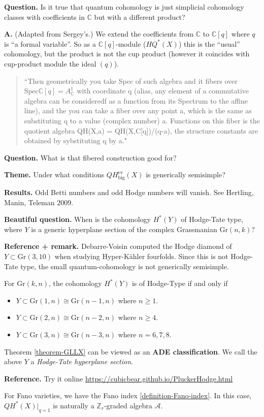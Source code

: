 {\bf Question.} Is it true that quantum cohomology is just simplicial cohomology
classes with coefficients in $\mathbb{C}$ but with a different product?

{\bf A.} (Adapted from Sergey's.) We extend the coefficients from $\mathbb{C}$
to $\mathbb{C}[q]$ where $q$ is ``a formal variable''. So as a
$\mathbb{C}[q]$-module ($HQ^*(X)$) this is the ``usual'' cohomology, but the
product is not the cup product (however it coincides with cup-product module the
ideal $(q)$).

\begin{quotation}
``Then geometrically you take Spec of such algebra and it
fibers over $\text{Spec} \mathbb{C}[q] = A^1_\mathbb{C}$ with coordinate q
(alias, any element of a commutative algebra can be consideredf as a function
from its Spectrum to the affine line), and the you can take a fiber over any
point a, which is the same as substituting q to a value (complex number) a.
Functions on this fiber is the quotient algebra QH(X,a) = QH(X,C[q])/(q-a), the
structure constants are obtained by sybstituting q by a."
\end{quotation}

{\bf Question.} What is that fibered construction good for?


{\bf Theme.} Under what conditions $QH^{\text{ev}}_{\text{big}}(X)$ is
generically semisimple?

{\bf Results.} Odd Betti numbers and odd Hodge numbers will vanish. See
Hertling, Manin, Teleman 2009.

{\bf Beautiful question.} When is the cohomology $H^*(Y)$ of Hodge-Tate type,
where $Y$ is a generic hyperplane section of the complex Grassmanian
$\text{Gr}(n,k)$?

{\bf Reference + remark.} Debarre-Voisin computed the Hodge diamond of $Y
\subset \text{Gr}(3,10)$ when studying Hyper-Kähler fourfolds. Since this is not
Hodge-Tate type, the small quantum-cohomology is not generically semisimple.

\begin{theorem}
\label{theorem-GLLX}
For $\text{Gr}(k,n)$, the cohomology $H^{*}(Y)$ is of Hodge-Type if and only if
\begin{itemize}
\item $Y \subset \text{Gr}(1,n)\cong \text{Gr}(n-1,n)$ where $n\geq 1$.
\item $Y \subset \text{Gr}(2,n) \cong \text{Gr}(n-2,n)$ where $n \geq 4$.
\item $Y \subset\text{Gr}(3,n) \cong\text{Gr}(n-3,n)$ where $n=6,7,8$.
\end{itemize}
\end{theorem}

Theorem \ref{theorem-GLLX} can be viewed as an {\bf ADE classification}. We call
the above $Y$ a {\it Hodge-Tate hyperplane section}.

{\bf Reference.} Try it online
\url{https://cubicbear.github.io/PluckerHodge.html} 

For Fano varieties, we have the Fano index \ref{definition-Fano-index}. In this
case, $QH^*(X)|_{q=1}$ is naturally a $\mathbb{Z}_r$-graded algebra
$\mathcal{A}$.






